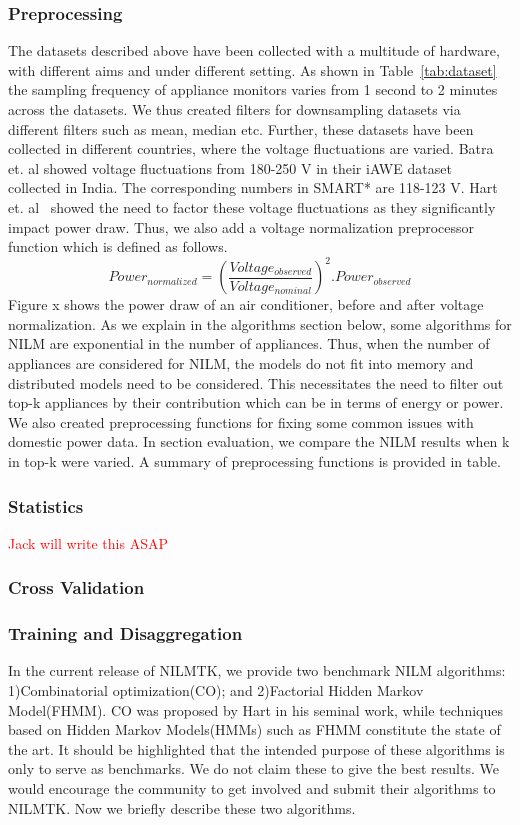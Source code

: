 \documentclass{sig-alternate}
\newcommand{\redcolor}[1]{\textcolor{red}{#1}}
\newcommand{\tabref}[1]{Table~\ref{#1}}
\begin{document}
\subsubsection{Preprocessing} The datasets described above have been collected with a multitude of hardware, with different aims and under different setting. As shown in \tabref{tab:dataset} the sampling frequency of appliance monitors varies from 1 second to 2 minutes across the datasets.  We thus created filters for downsampling datasets via different filters such as mean, median etc. Further, these datasets have been collected in different countries, where the voltage fluctuations are varied. Batra et. al showed voltage fluctuations from 180-250 V in their iAWE dataset~\cite{iawe} collected in India. The corresponding numbers in SMART* are 118-123 V. Hart et. al~\cite{hart_1992} showed the need to factor these voltage fluctuations as they significantly impact power draw. Thus, we also add a voltage normalization preprocessor function which is defined as follows. 
$$Power_{normalized} = (\frac{Voltage_{observed}}{Voltage_{nominal}})^2.Power_{observed}$$
Figure x shows the power draw of an air conditioner, before and after voltage normalization. As we explain in the algorithms section below, some algorithms for NILM are exponential in the number of appliances. Thus, when the number of appliances are considered for NILM, the models do not fit into memory and distributed models need to be considered. This necessitates the need to filter out top-k appliances by their contribution which can be in terms of energy or power.  We also created preprocessing functions for fixing some common issues with domestic power data. In section evaluation, we compare the NILM results when k in top-k were varied. A summary of preprocessing functions is provided in table.

\subsubsection{Statistics}

\redcolor{Jack will write this ASAP}

\subsubsection{Cross Validation} 

\subsubsection{Training and Disaggregation} In the current release of NILMTK, we provide two benchmark NILM algorithms: 1)Combinatorial optimization(CO); and 2)Factorial Hidden Markov Model(FHMM). CO was proposed by Hart in his seminal work, while techniques based on Hidden Markov Models(HMMs) such as FHMM constitute the state of the art. It should be highlighted that the intended purpose of these algorithms is only to serve as benchmarks. We do not claim these to give the best results. We would encourage the community to get involved and submit their algorithms to NILMTK. Now we briefly describe these two algorithms.
\end{document}
